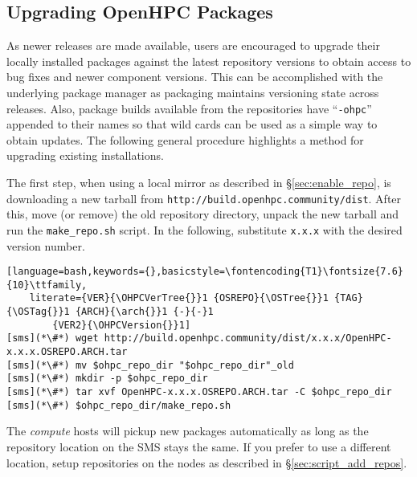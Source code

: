 \subsection{Upgrading OpenHPC Packages}  \label{appendix:upgrade}


As newer \OHPC{} releases are made available, users are encouraged to upgrade
their locally installed packages against the latest repository versions to
obtain access to bug fixes and newer component versions. This can be
accomplished with the underlying package manager as \OHPC{} packaging maintains
versioning state across releases. Also, package builds available from the
\OHPC{} repositories have ``\texttt{-ohpc}'' appended to their names so that
wild cards can be used as a simple way to obtain updates. The following general
procedure highlights a method for upgrading existing installations.

The first step, when using a local mirror as described in
\S\ref{sec:enable_repo}, is downloading a new tarball from \texttt{http://build.openhpc.community/dist}. 
After this, move (or remove) the old repository directory, unpack
the new tarball and run the \texttt{make\_repo.sh} script. In the following,
substitute \texttt{x.x.x} with the desired version number. 

\begin{lstlisting}[language=bash,keywords={},basicstyle=\fontencoding{T1}\fontsize{7.6}{10}\ttfamily,
	literate={VER}{\OHPCVerTree{}}1 {OSREPO}{\OSTree{}}1 {TAG}{\OSTag{}}1 {ARCH}{\arch{}}1 {-}{-}1 
        {VER2}{\OHPCVersion{}}1]
[sms](*\#*) wget http://build.openhpc.community/dist/x.x.x/OpenHPC-x.x.x.OSREPO.ARCH.tar
[sms](*\#*) mv $ohpc_repo_dir "$ohpc_repo_dir"_old
[sms](*\#*) mkdir -p $ohpc_repo_dir
[sms](*\#*) tar xvf OpenHPC-x.x.x.OSREPO.ARCH.tar -C $ohpc_repo_dir
[sms](*\#*) $ohpc_repo_dir/make_repo.sh
\end{lstlisting}

The {\em compute} hosts will pickup new packages automatically as long as the repository
location on the SMS stays the same. If you prefer to use a different location,
setup repositories on the nodes as described in \S\ref{sec:script_add_repos}.

